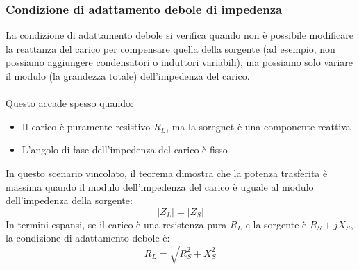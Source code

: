 \documentclass[../main.tex]{subfiles}
\begin{document}
	\subsubsection{Condizione di adattamento debole di impedenza}
	La condizione di adattamento debole si verifica quando non è possibile modificare la reattanza del carico per compensare quella della sorgente (ad esempio, non possiamo aggiungere condensatori o induttori variabili), ma possiamo solo variare il modulo (la grandezza totale) dell'impedenza del carico.\\\\
	Questo accade spesso quando:
	\begin{itemize}
		\item Il carico è puramente resistivo $R_L$, ma la soregnet è una componente reattiva
		\item L'angolo di fase dell'impedenza del carico è fisso
	\end{itemize}
	In questo scenario vincolato, il teorema dimostra che la potenza trasferita è massima quando il modulo dell'impedenza del carico è uguale al modulo dell'impedenza della sorgente:
	\begin{equation}
		\left| Z_L \right| = \left| Z_S \right| 
	\end{equation}
	In termini espansi, se il carico è una resistenza pura $R_L$ e la sorgente è $R_S + jX_S$, la condizione di adattamento debole è:
	\begin{equation}
		R_L = \sqrt{R_S^2 + X_S^2}
	\end{equation}
\end{document}
